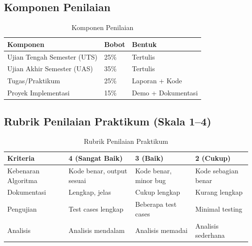 \documentclass[12pt,a4paper]{article}
\begin{document}
\subsection{Komponen Penilaian}
\begin{table}[!htbp]
\centering
\begin{tabular}{|l|l|l|}
\hline
\textbf{Komponen} & \textbf{Bobot} & \textbf{Bentuk} \\
\hline
Ujian Tengah Semester (UTS) & 25\% & Tertulis \\
Ujian Akhir Semester (UAS) & 35\% & Tertulis \\
Tugas/Praktikum & 25\% & Laporan + Kode \\
Proyek Implementasi & 15\% & Demo + Dokumentasi \\
\hline
\end{tabular}
\caption{Komponen Penilaian}
\end{table}

\subsection{Rubrik Penilaian Praktikum (Skala 1--4)}
\begin{table}[!htbp]
\centering
\small
\begin{tabular}{|>{\raggedright\arraybackslash}p{2.2cm}|>{\raggedright\arraybackslash}p{2.5cm}|>{\raggedright\arraybackslash}p{2.5cm}|>{\raggedright\arraybackslash}p{2.5cm}|}
\hline
\textbf{Kriteria} & \textbf{4 (Sangat Baik)} & \textbf{3 (Baik)} & \textbf{2 (Cukup)} \\
\hline
Kebenaran Algoritma & Kode benar, output sesuai & Kode benar, minor bug & Kode sebagian benar \\
\hline
Dokumentasi & Lengkap, jelas & Cukup lengkap & Kurang lengkap \\
\hline
Pengujian & Test cases lengkap & Beberapa test cases & Minimal testing \\
\hline
Analisis & Analisis mendalam & Analisis memadai & Analisis sederhana \\
\hline
\end{tabular}
\caption{Rubrik Penilaian Praktikum}
\end{table}
\end{document}
